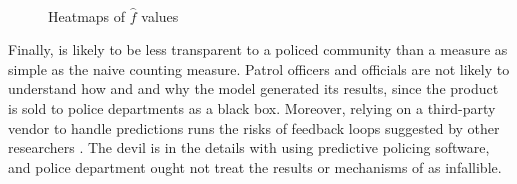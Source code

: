 \begin{figure}[bth]
    \myfloatalign
     \quad
     \\
    \caption{Heatmaps of $\hat{f}$ values}
    \label{fig:heatmaps_f_hat}
\end{figure}

Finally, \pp is likely to be less transparent to a policed community than a measure as simple as the naive counting measure. Patrol officers and officials are not likely to understand how and and why the model generated its results, since the product is sold to police departments as a black box. Moreover, relying on a third-party vendor to handle predictions runs the risks of feedback loops suggested by other researchers \citep{lum_predict_2016,ensign_runaway_2017,ensign_decision_2018}. The devil is in the details with using predictive policing software, and police department ought not treat the results or mechanisms of \pp as infallible.
